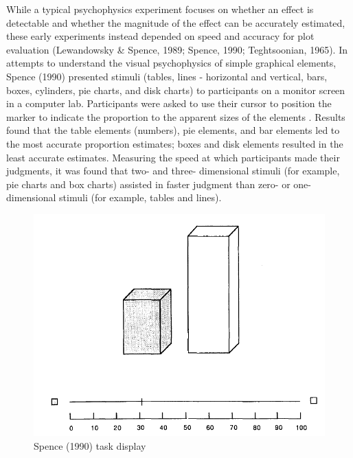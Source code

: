\documentclass[print]{nuthesis}
\begin{document}
While a typical psychophysics experiment focuses on whether an effect is detectable and whether the magnitude of the effect can be accurately estimated, these early experiments instead depended on speed and accuracy for plot evaluation (Lewandowsky \& Spence, 1989; Spence, 1990; Teghtsoonian, 1965).
In attempts to understand the visual psychophysics of simple graphical elements, Spence (1990) presented stimuli (tables, lines - horizontal and vertical, bars, boxes, cylinders, pie charts, and disk charts) to participants on a monitor screen in a computer lab.
Participants were asked to use their cursor to position the marker to indicate the proportion to the apparent sizes of the elements .
Results found that the table elements (numbers), pie elements, and bar elements led to the most accurate proportion estimates; boxes and disk elements resulted in the least accurate estimates.
Measuring the speed at which participants made their judgments, it was found that two- and three- dimensional stimuli (for example, pie charts and box charts) assisted in faster judgment than zero- or one- dimensional stimuli (for example, tables and lines).

\begin{figure}[tbp]

{\centering \includegraphics[width=0.75\linewidth,]{images/spence-1990-proportion} 

}

\caption{Spence (1990) task display}\label{fig:spence-1990-proportion}
\end{figure}
\end{document}
